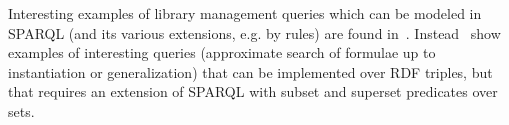 Interesting examples of library management queries which can be modeled in SPARQL (and its various extensions, e.g. by rules) are found in~\cite{conf/lpar/AspinallDL12}. Instead~\cite{AGSTZ:ContMathSearchWhelp04,MKM04:AspertiS04} show examples of interesting queries (approximate search of formulae up to instantiation or generalization) that can be implemented over RDF triples, but that requires an extension of SPARQL with subset and superset predicates over sets.
%
%
